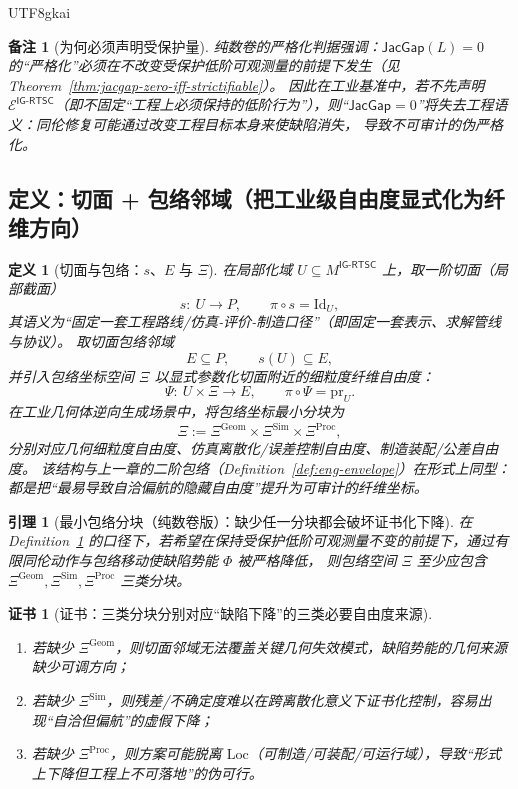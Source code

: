 \documentclass[12pt]{article}
\newtheorem{definition}{定义}[section]
\newtheorem{lemma}{引理}[section]
\newtheorem{remark}{备注}[section]
\newtheorem{certificate}{证书}[section]
\newcommand{\JacGap}{\ensuremath{\mathsf{JacGap}}}
\begin{document}
\begin{CJK*}{UTF8}{gkai}
\begin{remark}[为何必须声明受保护量]
纯数卷的严格化判据强调：$\JacGap(L)=0$ 的“严格化”必须在不改变受保护低阶可观测量的前提下发生（见 Theorem~\ref{thm:jacgap-zero-iff-strictifiable}）。
因此在工业基准中，若不先声明 $\mathcal{E}^{\textsf{IG-RTSC}}$（即不固定“工程上必须保持的低阶行为”），则“$\JacGap=0$”将失去工程语义：同伦修复可能通过改变工程目标本身来使缺陷消失，
  导致不可审计的伪严格化。
\end{remark}

\subsection{定义：切面 + 包络邻域（把工业级自由度显式化为纤维方向）}

\begin{definition}[切面与包络：$s$、$E$ 与 $\Xi$]
\label{def:ig-section-envelope}
在局部化域 $U\subseteq M^{\textsf{IG-RTSC}}$ 上，取一阶切面（局部截面）
\[
s:\ U\to P,
\qquad
\pi\circ s=\mathrm{Id}_U,
\]
其语义为“固定一套工程路线/仿真‑评价‑制造口径”（即固定一套表示、求解管线与协议）。
取切面包络邻域
\[
E\subseteq P,
\qquad
s(U)\subseteq E,
\]
并引入包络坐标空间 $\Xi$ 以显式参数化切面附近的细粒度纤维自由度：
\[
\Psi:\ U\times \Xi \to E,
\qquad
\pi\circ \Psi=\mathrm{pr}_U.
\]
在工业几何体逆向生成场景中，将包络坐标最小分块为
\[
\Xi
:=
\Xi^{\mathrm{Geom}}
\times
\Xi^{\mathrm{Sim}}
\times
\Xi^{\mathrm{Proc}},
\]
分别对应几何细粒度自由度、仿真离散化/误差控制自由度、制造装配/公差自由度。
该结构与上一章的二阶包络（Definition~\ref{def:eng-envelope}）在形式上同型：都是把“最易导致自洽偏航的隐藏自由度”提升为可审计的纤维坐标。
\end{definition}

\begin{lemma}[最小包络分块（纯数卷版）：缺少任一分块都会破坏证书化下降]
\label{lem:ig-minimal-envelope}
在 Definition~\ref{def:ig-section-envelope} 的口径下，若希望在保持受保护低阶可观测量不变的前提下，通过有限同伦动作与包络移动使缺陷势能 $\Phi$ 被严格降低，
则包络空间 $\Xi$ 至少应包含 $\Xi^{\mathrm{Geom}},\Xi^{\mathrm{Sim}},\Xi^{\mathrm{Proc}}$ 三类分块。
\end{lemma}

\begin{certificate}[证书：三类分块分别对应“缺陷下降”的三类必要自由度来源]
\label{cert:ig-minimal-envelope}
\begin{enumerate}
  \item 若缺少 $\Xi^{\mathrm{Geom}}$，则切面邻域无法覆盖关键几何失效模式，缺陷势能的几何来源缺少可调方向；
  \item 若缺少 $\Xi^{\mathrm{Sim}}$，则残差/不确定度难以在跨离散化意义下证书化控制，容易出现“自洽但偏航”的虚假下降；
  \item 若缺少 $\Xi^{\mathrm{Proc}}$，则方案可能脱离 $\mathrm{Loc}$（可制造/可装配/可运行域），导致“形式上下降但工程上不可落地”的伪可行。
\end{enumerate}
\end{certificate}


\end{CJK*}
\end{document}
